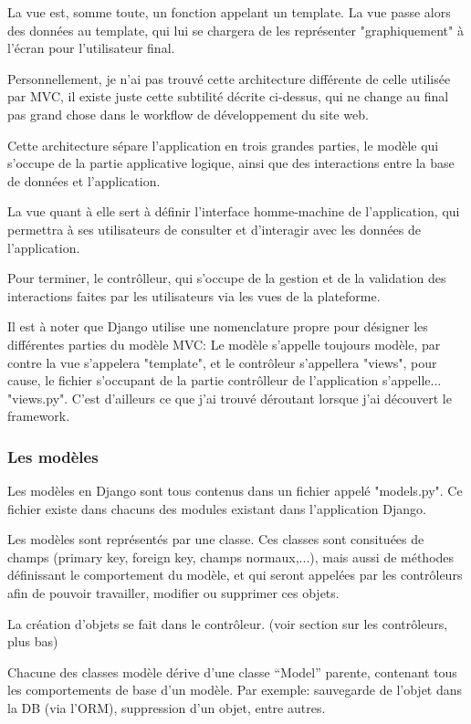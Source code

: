 \documentclass[12pt,table,a4paper]{report}
\begin{document}
La vue est, somme toute, un fonction appelant un template. La vue passe alors des données au template, qui lui se chargera de les représenter "graphiquement" à l'écran pour l'utilisateur final.

Personnellement, je n'ai pas trouvé cette architecture différente de celle utilisée par MVC, il existe juste cette subtilité décrite ci-dessus, qui ne change au final pas grand chose dans le workflow de développement du site web.

Cette architecture sépare l'application en trois grandes parties, le modèle qui s'occupe de la partie applicative logique, ainsi que des interactions entre la base de données et l'application.

La vue quant à elle sert à définir l'interface homme-machine de l'application, qui permettra à ses utilisateurs de consulter et d'interagir avec les données de l'application.

Pour terminer, le contrôlleur, qui s'occupe de la gestion et de la validation des interactions faites par les utilisateurs via les vues de la plateforme.

Il est à noter que Django utilise une nomenclature propre pour désigner les différentes parties du modèle MVC: Le modèle s'appelle toujours modèle, par contre la vue s'appelera "template", et le contrôleur s'appellera "views", pour cause, le fichier s'occupant de la partie contrôlleur de l'application s'appelle... "views.py". C'est d'ailleurs ce que j'ai trouvé déroutant lorsque j'ai découvert le framework.

\subsubsection{Les modèles}
Les modèles en Django sont tous contenus dans un fichier appelé "models.py". Ce fichier existe dans chacuns des modules existant dans l'application Django.

Les modèles sont représentés par une classe. Ces classes sont consituées de champs (primary key, foreign key, champs normaux,...), mais aussi de méthodes définissant le comportement du modèle, et qui seront appelées par les contrôleurs afin de pouvoir travailler, modifier ou supprimer ces objets.

La création d'objets se fait dans le contrôleur. (voir section sur les contrôleurs, plus bas)

Chacune des classes modèle dérive d'une classe "`Model"' parente, contenant tous les comportements de base d'un modèle. Par exemple: sauvegarde de l'objet dans la DB (via l'ORM), suppression d'un objet, entre autres.
\end{document}
